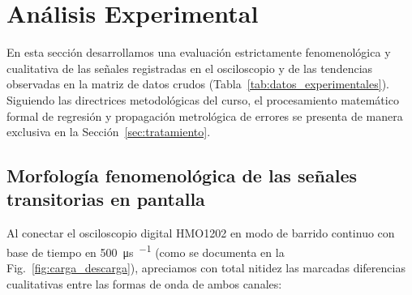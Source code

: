 
\section{Análisis Experimental}
\label{sec:analisis_exp}

En esta sección desarrollamos una evaluación estrictamente fenomenológica y cualitativa de las señales registradas en el osciloscopio y de las tendencias observadas en la matriz de datos crudos (Tabla~\ref{tab:datos_experimentales}). Siguiendo las directrices metodológicas del curso, el procesamiento matemático formal de regresión y propagación metrológica de errores se presenta de manera exclusiva en la Sección~\ref{sec:tratamiento}.

\subsection{Morfología fenomenológica de las señales transitorias en pantalla}

Al conectar el osciloscopio digital HMO1202 en modo de barrido continuo con base de tiempo en \qty{500}{\micro\second\per\division} (como se documenta en la Fig.~\ref{fig:carga_descarga}), apreciamos con total nitidez las marcadas diferencias cualitativas entre las formas de onda de ambos canales:

